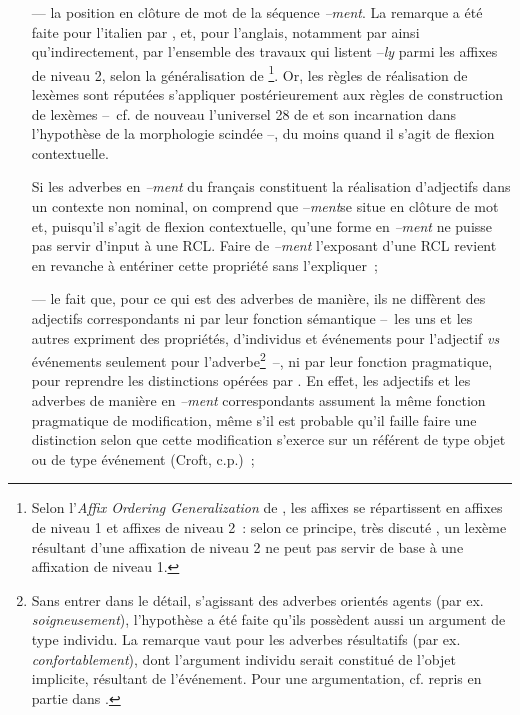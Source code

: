 \documentclass[output=paper]{langsci/langscibook}
\begin{document}
\begin{itemize}

\item[---] la position en clôture de mot de la séquence \emph{--ment}. La remarque a été faite pour l'italien par %
\citet{Ricca98}%
%
, et, pour l'anglais, notamment par %
\citet{Geuder00} %
%
ainsi qu'indirectement, par l'ensemble des travaux qui listent --\emph{ly} parmi les affixes de niveau 2, selon la généralisation de %
\citet{Siegel79}%
%
\footnote{Selon l'\emph{Affix Ordering Generalization} de %
\citet{Siegel79}%
%
, les affixes se répartissent en affixes de niveau 1 et affixes de niveau 2~: selon ce principe, très discuté %
\citep[par ex. ][]{Fabb88}%
%
, un lexème résultant d'une affixation de niveau 2 ne peut pas servir de base à une affixation de niveau 1.}. Or, les règles de réalisation de lexèmes sont réputées s'appliquer postérieurement aux règles de construction de lexèmes --~cf. de nouveau l'universel 28 de \citeauthor{Greenberg1963} et son incarnation dans l'hypothèse de la morphologie scindée --, du moins quand il s'agit de flexion contextuelle.

Si les adverbes en \emph{--ment} du français constituent la réalisation d'adjectifs dans un contexte non nominal, on comprend que --\emph{ment}se situe en clôture de mot et, puisqu'il s'agit de flexion contextuelle, qu'une forme en \emph{--ment} ne puisse pas servir d'input à une RCL. Faire de \emph{--ment} l'exposant d'une RCL revient en revanche à entériner cette propriété sans l'expliquer~;

\item[---] le fait que, pour ce qui est des adverbes de manière, ils ne diffèrent des adjectifs correspondants ni par leur fonction sémantique --~les uns et les autres expriment des propriétés, d'individus et événements pour l'adjectif \emph{vs} événements seulement pour l'adverbe\footnote{Sans entrer dans le détail, s'agissant des adverbes orientés agents (par ex. \emph{soigneusement}), l'hypothèse a été faite qu'ils possèdent aussi un argument de type individu. La remarque vaut pour les adverbes résultatifs (par ex. \emph{confortablement}), dont l'argument individu serait constitué de l'objet implicite, résultant de l'événement. Pour une argumentation, cf. %
\citet{Geuder00} %
%
repris en partie dans %
\citet{Bonami04}%
%
.}~--, ni par leur fonction pragmatique, pour reprendre les distinctions opérées par %
\citet[185]{croft03}%
%
. En effet, les adjectifs et les adverbes de manière en \emph{--ment} correspondants assument la même fonction pragmatique de modification, même s'il est probable qu'il faille faire une distinction selon que cette modification s'exerce sur un référent de type objet ou de type événement (Croft, c.p.)~;


\end{itemize}
\end{document}
